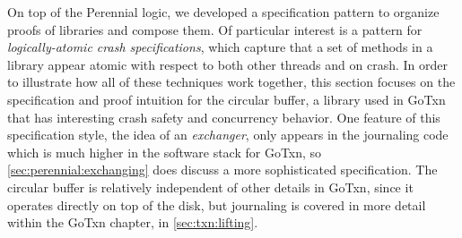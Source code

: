 On top of the Perennial logic, we developed a specification pattern to organize
proofs of libraries and compose them. Of particular interest is a pattern for
\emph{logically-atomic crash specifications}, which capture that a set of
methods in a library appear atomic with respect to both other threads and on
crash. In order to illustrate how all of these techniques work together, this
section focuses on the specification and proof intuition for the circular
buffer, a library used in GoTxn that has interesting crash safety and
concurrency behavior. One feature of this specification style, the idea of an
\emph{exchanger}, only appears in the journaling code which is much higher in
the software stack for GoTxn, so \cref{sec:perennial:exchanging} does discuss a
more sophisticated specification. The circular buffer is relatively independent
of other details in GoTxn, since it operates directly on top of the disk, but
journaling is covered in more detail within the GoTxn chapter, in
\cref{sec:txn:lifting}.



